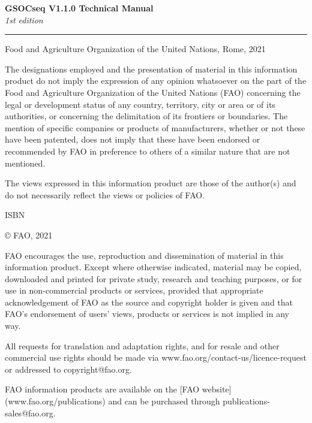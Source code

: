 ﻿\pagestyle{plain}

\begin{titlepage}
    \begin{center}
        \vspace*{4cm}
        \Large

        \textcolor{astral}{\textbf{GSOCseq V1.1.0 Technical Manual\\}}
        \vspace{0.5cm}
        \normalsize
        \emph{1st edition}
        \vfill
        \noindent
        {\color{astral}\rule{\linewidth}{0.5mm} }

        Food and Agriculture Organization of the United Nations, Rome, 2021
    \end{center}
\end{titlepage}

\clearpage
\thispagestyle{empty}

\vfill
{\footnotesize
\vspace*{4cm}
\vfill
The designations employed and the presentation of material in this information product do not imply the expression of any opinion whatsoever on the part of the Food and Agriculture Organization of the United Nations (FAO) concerning the legal or development status of any country, territory, city or area or of its authorities, or concerning the delimitation of its frontiers or boundaries. The mention of specific companies or products of manufacturers, whether or not these have been patented, does not imply that these have been endorsed or recommended by FAO in preference to others of a similar nature that are not mentioned.

The views expressed in this information product are those of the author(s) and do not necessarily reflect the views or policies of FAO.

ISBN 

\copyright \xspace FAO, 2021

FAO encourages the use, reproduction and dissemination of material in this information product. Except where otherwise indicated, material may be copied, downloaded and printed for private study, research and teaching purposes, or for use in non-commercial products or services, provided that appropriate acknowledgement of FAO as the source and copyright holder is given and that FAO’s endorsement of users’ views, products or services is not implied in any way.

All requests for translation and adaptation rights, and for resale and other commercial use rights should be made via www.fao.org/contact-us/licence-request or addressed to copyright@fao.org.


FAO information products are available on the [FAO website](www.fao.org/publications) and can be purchased through publications-sales@fao.org.
}

